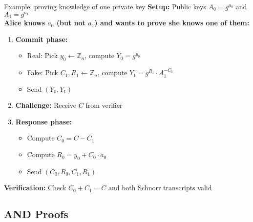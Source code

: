 \documentclass[aspectratio=169, lualatex, handout]{beamer}
\begin{document}
\begin{frame}{Example: proving knowledge of one private key}
	\textbf{Setup:} Public keys $A_0 = g^{a_0}$ and $A_1 = g^{a_1}$\\
	\textbf{Alice knows $a_0$ (but not $a_1$) and wants to prove she knows one of them:}
	\begin{enumerate}
		\item \textbf{Commit phase:}
		      \begin{itemize}
			      \item Real: Pick $y_0 \leftarrow \mathbb{Z}_n$, compute $Y_0 = g^{y_0}$
			      \item Fake: Pick $C_1, R_1 \leftarrow \mathbb{Z}_n$, compute $Y_1 = g^{R_1} \cdot A_1^{-C_1}$
			      \item Send $(Y_0, Y_1)$
		      \end{itemize}
		\item \textbf{Challenge:} Receive $C$ from verifier
		\item \textbf{Response phase:}
		      \begin{itemize}
			      \item Compute $C_0 = C - C_1$
			      \item Compute $R_0 = y_0 + C_0 \cdot a_0$
			      \item Send $(C_0, R_0, C_1, R_1)$
		      \end{itemize}
	\end{enumerate}
	\textbf{Verification:} Check $C_0 + C_1 = C$ and both Schnorr transcripts valid
\end{frame}

\subsection{AND Proofs}
\end{document}
